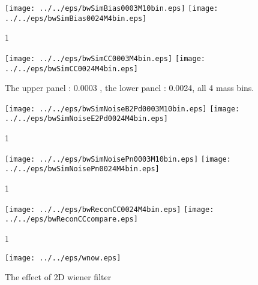\begin{figure}[tbp]
\begin{center}
\texttt{[image: ../../eps/bwSimBias0003M10bin.eps]}
\texttt{[image: ../../eps/bwSimBias0024M4bin.eps]}
\end{center}
\vspace{-0.7cm}
\caption{1}
\label{fig:bw1}
\end{figure}
\begin{figure}[tbp]
\begin{center}
\texttt{[image: ../../eps/bwSimCC0003M4bin.eps]}
\texttt{[image: ../../eps/bwSimCC0024M4bin.eps]}
\end{center}
\vspace{-0.7cm}
\caption{The upper panel : 0.0003 , the lower panel : 0.0024, all 4 mass bins.}
\label{fig:bw2}
\end{figure}
\begin{figure}[tbp]
\begin{center}
\texttt{[image: ../../eps/bwSimNoiseB2Pd0003M10bin.eps]}
\texttt{[image: ../../eps/bwSimNoiseE2Pd0024M4bin.eps]}
\end{center}
\vspace{-0.7cm}
\caption{1}
\label{fig:bw3}
\end{figure}
\begin{figure}[tbp]
\begin{center}
\texttt{[image: ../../eps/bwSimNoisePn0003M10bin.eps]}
\texttt{[image: ../../eps/bwSimNoisePn0024M4bin.eps]}
\end{center}
\vspace{-0.7cm}
\caption{1}
\label{fig:bw4}
\end{figure}
\begin{figure}[tbp]
\begin{center}
\texttt{[image: ../../eps/bwReconCC0024M4bin.eps]}
\texttt{[image: ../../eps/bwReconCCcompare.eps]}
\end{center}
\vspace{-0.7cm}
\caption{1}
\label{fig:bw5}
\end{figure}

\begin{figure}[tbp]
\begin{center}
\texttt{[image: ../../eps/wnow.eps]}
\end{center}
\vspace{-0.7cm}
\caption{The effect of 2D wiener filter}
\label{fig:Wf}
\end{figure}